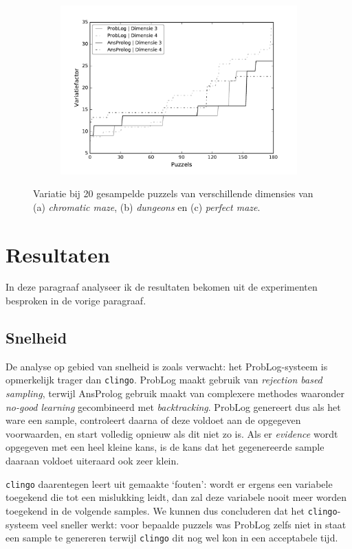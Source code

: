\documentclass{article}
\begin{document}
\begin{figure}[t]
\begin{subfigure}{.33\textwidth}
  \includegraphics[width=\linewidth]{Grafieken/Variatie/Perfect Maze/perfectmaze.pdf}
  \caption{}
  \label{fig:sub3}
\end{subfigure}
\caption{Variatie bij 20 gesampelde puzzels van verschillende dimensies van (a) \textit{chromatic maze}, (b) \textit{dungeons} en (c) \textit{perfect maze}.}
\label{fig:test}
\end{figure}

\section{Resultaten}
In deze paragraaf analyseer ik de resultaten bekomen uit de experimenten besproken in de vorige paragraaf. 
	\subsection{Snelheid}
	De analyse op gebied van snelheid is zoals verwacht: het ProbLog-systeem is opmerkelijk trager dan \texttt{clingo}. ProbLog maakt gebruik van \textit{rejection based sampling}, terwijl AnsProlog gebruik maakt van complexere methodes waaronder \textit{no-good learning} gecombineerd met \textit{backtracking}. ProbLog genereert dus als het ware een sample, controleert daarna of deze voldoet aan de opgegeven voorwaarden, en start volledig opnieuw als dit niet zo is. Als er \textit{evidence} wordt opgegeven met een heel kleine kans, is de kans dat het gegenereerde sample daaraan voldoet uiteraard ook zeer klein.
	
	 \texttt{clingo} daarentegen leert uit gemaakte `fouten': wordt er ergens een variabele toegekend die tot een mislukking leidt, dan zal deze variabele nooit meer worden toegekend in de volgende samples. We kunnen dus concluderen dat het \texttt{clingo}-systeem veel sneller werkt: voor bepaalde puzzels was ProbLog zelfs niet in staat een sample te genereren terwijl \texttt{clingo} dit nog wel kon in een acceptabele tijd.
	 
\end{document}
